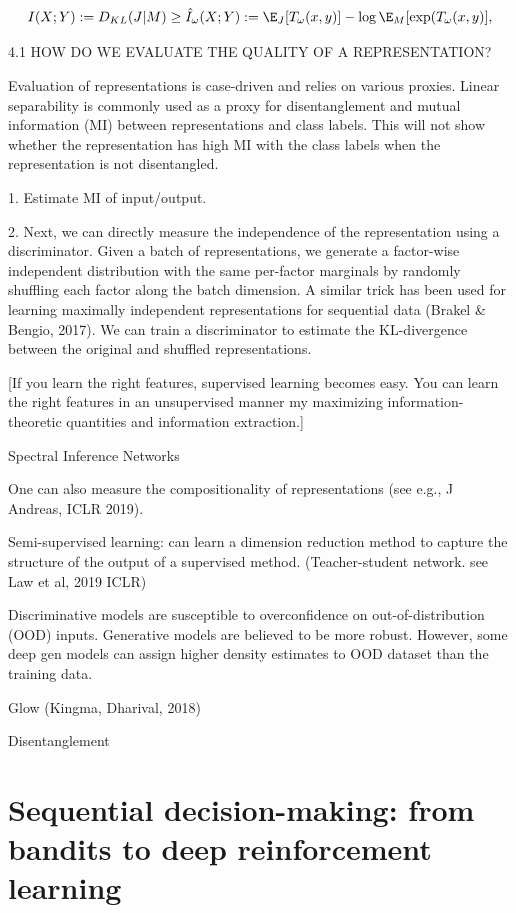 \documentclass[english]{article}
\begin{document}
$$I(X;Y) := D_{KL}(J|M) \ge \hat I_\omega(X;Y) 
:= \E_J[T_\omega (x,y)] - \log \E_M [\exp(T_\omega(x,y)],$$ 

4.1 HOW DO WE EVALUATE THE QUALITY OF A REPRESENTATION?

Evaluation of representations is case-driven and relies on various proxies. Linear separability is
commonly used as a proxy for disentanglement and mutual information (MI) between representations
and class labels.  This will not show whether the representation has high MI with
the class labels when the representation is not disentangled.


1. Estimate MI of input/output. 

2. Next, we can directly measure the independence of the representation using a discriminator. Given a
batch of representations, we generate a factor-wise independent distribution with the same per-factor
marginals by randomly shuffling each factor along the batch dimension. A similar trick has been used
for learning maximally independent representations for sequential data (Brakel \& Bengio, 2017). We
can train a discriminator to estimate the KL-divergence between the original and shuffled representations.


[If you learn the right features, supervised learning becomes easy. You can learn the right features in an unsupervised manner my maximizing information-theoretic quantities and information extraction.]

\item Spectral Inference Networks

One can also measure the compositionality of representations (see e.g., J Andreas, ICLR 2019).

\item Semi-supervised learning: can learn a dimension reduction method to capture the structure of the output of a supervised method. (Teacher-student network. see Law et al, 2019 ICLR)

\item Discriminative models are susceptible to overconfidence on out-of-distribution (OOD) inputs. Generative models are believed to be more robust. However, some deep gen models can assign higher density estimates to OOD dataset than the training data.

\item Glow (Kingma, Dharival, 2018)

Disentanglement
\eenum



\section{Sequential decision-making: from bandits to deep reinforcement learning}
\end{document}
